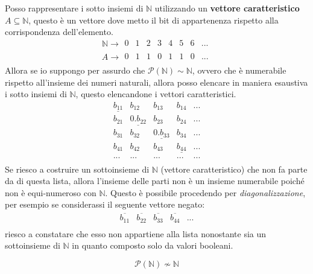 \documentclass{article}
\begin{document}
Posso rappresentare i sotto insiemi di $\mathbb{N}$ utilizzando un \textbf{vettore caratteristico}
$A\subseteq\mathbb{N}$, questo è un vettore dove metto il bit di appartenenza rispetto alla corrispondenza
dell'elemento.
\[
    \mathbb{N}\rightarrow
    \begin{array}{cccccccc}
        0 & 1 & 2 & 3 & 4 & 5 & 6 & ... \\
    \end{array}
\]
\[
    A\rightarrow
    \begin{array}{cccccccc}
        0 & 1 & 1 & 0 & 1 & 1 & 0 & ... \\
    \end{array}
\]
Allora se io suppongo per assurdo che $\mathcal{P}(\mathbb{N})\sim\mathbb{N}$, ovvero che è numerabile
rispetto all'insieme dei numeri naturali, allora posso elencare in maniera esaustiva i sotto insiemi
di $\mathbb{N}$, questo elencandone i vettori caratteristici.
\[
    \begin{array}{ccccc}
        \underline{b_{11}} & b_{12}             & b_{13}             & b_{14}             & ... \\
        b_{21}             & \underline{0.b_{22}} & b_{23}             & b_{24}             & ... \\
        b_{31}             & b_{32}             & \underline{0.b_{33}} & b_{34}             & ... \\
        b_{41}             & b_{42}             & b_{43}             & \underline{b_{44}} & ... \\
        ...                  & ...                  & ...                  & ...                  & ... \\
    \end{array}
\]
Se riesco a costruire un sottoinsieme di $\mathbb{N}$ (vettore caratteristico) che non fa parte da di questa lista,
allora l'insieme delle parti non è un insieme numerabile poiché non è equi-numeroso con $\mathbb{N}$. Questo
è possibile procedendo per \textit{diagonalizzazione}, per esempio se considerassi il seguente vettore negato:
\[
    \begin{array}{ccccc}
        \overline{b_{11}} & \overline{b_{22}} & \overline{b_{33}} & \overline{b_{44}} & ... \\
    \end{array}
\]
riesco a constatare che esso non appartiene alla lista nonostante sia un sottoinsieme di $\mathbb{N}$
in quanto composto solo da valori booleani.

$$\mathcal{P}(\mathbb{N})\nsim\mathbb{N}$$
\end{document}
